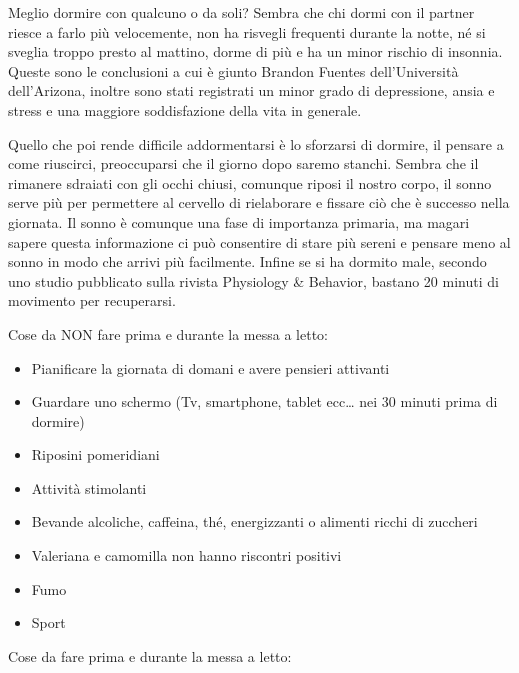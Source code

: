 \documentclass[12pt]{book} %
\begin{document}
\begin{mdframed}[linewidth=1pt]
Meglio dormire con qualcuno o da soli? Sembra che chi dormi con
il partner riesce a farlo più velocemente, non ha risvegli frequenti durante la notte, né si sveglia troppo presto al
mattino, dorme di più e ha un minor rischio di insonnia. Queste sono le conclusioni a cui è giunto Brandon Fuentes
dell'Università dell'Arizona, inoltre sono stati registrati un minor grado di depressione, ansia e stress e una
maggiore soddisfazione della vita in generale. 

Quello che poi rende difficile addormentarsi è lo sforzarsi di dormire, il pensare a come riuscirci, preoccuparsi che il giorno dopo saremo stanchi. Sembra che il rimanere sdraiati con gli occhi chiusi, comunque riposi il nostro corpo, il sonno serve più per permettere al cervello di rielaborare e fissare ciò che è successo nella giornata. Il sonno è comunque una fase di importanza primaria, ma magari sapere questa informazione ci può consentire di stare più sereni e pensare meno al sonno in modo che arrivi più facilmente. 
Infine se si ha dormito male, secondo uno studio pubblicato sulla rivista Physiology \& Behavior, bastano 20 minuti di movimento per recuperarsi.

Cose da NON fare prima e durante la messa a letto:

\begin{itemize}
\item Pianificare la giornata di domani e avere pensieri attivanti
\item Guardare uno schermo (Tv, smartphone, tablet ecc… nei 30 minuti prima di dormire)
\item Riposini pomeridiani
\item Attività stimolanti
\item Bevande alcoliche, caffeina, thé, energizzanti o alimenti ricchi di zuccheri
\item Valeriana e camomilla non hanno riscontri positivi 
\item Fumo
\item Sport
\end{itemize}

Cose da fare prima e durante la messa a letto:


\end{mdframed}
\end{document}

